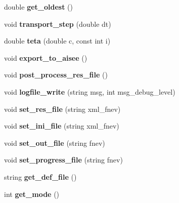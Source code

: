 \begin{DoxyCompactItemize}
\mbox{\label{class_staci_a7dde80c0f00d33639f459fca9d7b1314}} 
double {\bfseries get\+\_\+oldest} ()
\item 
\mbox{\label{class_staci_a82c116ba2e4338362e1efa7410acba07}} 
void {\bfseries transport\+\_\+step} (double dt)
\item 
\mbox{\label{class_staci_a2ae0957cb2159f7417175379bac09d95}} 
double {\bfseries teta} (double c, const int i)
\item 
\mbox{\label{class_staci_a7c79de7b27f86ef08e48eef757e895fa}} 
void {\bfseries export\+\_\+to\+\_\+aisee} ()
\item 
\mbox{\label{class_staci_ac0af3f19c34f3a08e4892cebdc5e0340}} 
void {\bfseries post\+\_\+process\+\_\+res\+\_\+file} ()
\item 
\mbox{\label{class_staci_af0d4816a00fec9373f469a7854f09a0e}} 
void {\bfseries logfile\+\_\+write} (string msg, int msg\+\_\+debug\+\_\+level)
\item 
\mbox{\label{class_staci_a03c12265bef1640238ffe1efdb0a2556}} 
void {\bfseries set\+\_\+res\+\_\+file} (string xml\+\_\+fnev)
\item 
\mbox{\label{class_staci_a2939f5a02b2d06e21be553d31a15106c}} 
void {\bfseries set\+\_\+ini\+\_\+file} (string xml\+\_\+fnev)
\item 
\mbox{\label{class_staci_a80220c0c3baa490866bd2fc15698a8d1}} 
void {\bfseries set\+\_\+out\+\_\+file} (string fnev)
\item 
\mbox{\label{class_staci_a00500602fabd3f2cdc0bd7fedc845787}} 
void {\bfseries set\+\_\+progress\+\_\+file} (string fnev)
\item 
\mbox{\label{class_staci_a61dc8ef1b4e1561938e6cc39917b346f}} 
string {\bfseries get\+\_\+def\+\_\+file} ()
\item 
\mbox{\label{class_staci_a0c822a9effbcf4dd88b82f68b38c0498}} 
int {\bfseries get\+\_\+mode} ()

\end{DoxyCompactItemize}
